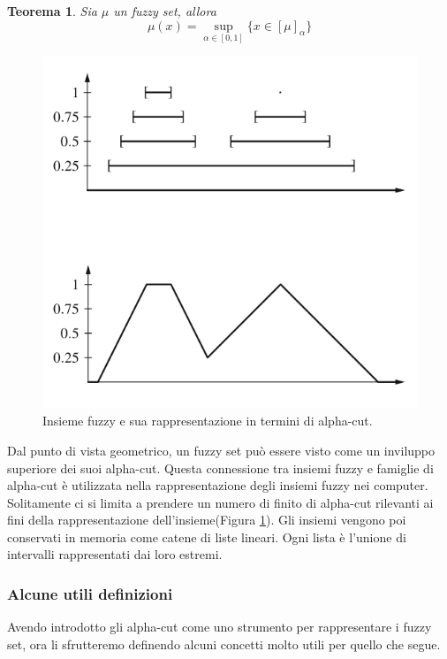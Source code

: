 \documentclass[10pt,a4paper]{article}
\newtheorem{theorem}{Teorema}
\begin{document}
\begin{theorem}
Sia $\mu$ un fuzzy set, allora
$$
\mu(x) = \sup_{\alpha \in [0,1]} \{x \in [\mu]_\alpha\}
$$
\end{theorem}

\begin{figure}
\centering
\includegraphics[scale=0.3]{img/alpha_cut.png}
\caption{Insieme fuzzy e sua rappresentazione in termini di alpha-cut.}
\label{fig:25}
\end{figure}

Dal punto di vista geometrico, un fuzzy set può essere visto come un inviluppo superiore dei suoi alpha-cut. Questa connessione tra insiemi fuzzy e famiglie di alpha-cut è utilizzata nella rappresentazione degli insiemi fuzzy nei computer. Solitamente ci si limita a prendere un numero di finito di alpha-cut rilevanti ai fini della rappresentazione dell'insieme(Figura \ref{fig:25}). Gli insiemi vengono poi conservati in memoria come catene di liste lineari. Ogni lista è l'unione di intervalli rappresentati dai loro estremi. 

\subsubsection{Alcune utili definizioni}

Avendo introdotto gli alpha-cut come uno strumento per rappresentare i fuzzy set, ora li sfrutteremo definendo alcuni concetti molto utili per quello che segue.
\end{document}
